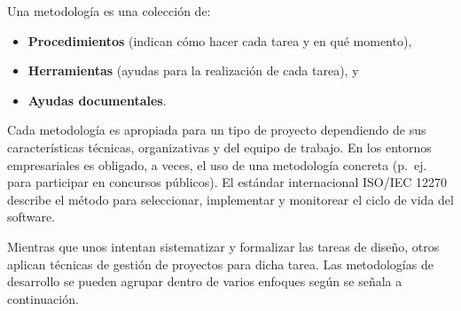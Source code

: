 Una metodología es una colección de:

\begin{itemize}
\item \textbf{Procedimientos} (indican cómo hacer cada tarea y en qué momento),
\item \textbf{Herramientas} (ayudas para la realización de cada tarea), y
\item \textbf{Ayudas documentales}.
\end{itemize}

Cada metodología es apropiada para un tipo de proyecto dependiendo de sus características técnicas, organizativas y del equipo de trabajo. En los entornos empresariales es obligado, a veces, el uso de una metodología concreta (p.~ej. para participar en concursos públicos). El estándar internacional ISO/IEC 12270 describe el método para seleccionar, implementar y monitorear el ciclo de vida del software.

Mientras que unos intentan sistematizar y formalizar las tareas de diseño, otros aplican técnicas de gestión de proyectos para dicha tarea. Las metodologías de desarrollo se pueden agrupar dentro de varios enfoques según se señala a continuación.

